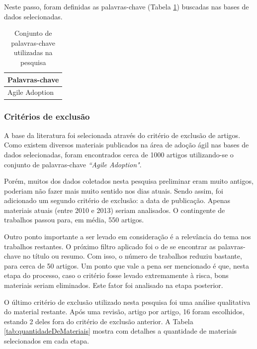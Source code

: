 Neste passo, foram definidas as palavras-chave (Tabela \ref{tab:palavrasChave}) buscadas nas bases de dados selecionadas.

\begin{table}[H]
	\centering
	\begin{tabular}{| l |} \hline \textbf{Palavras-chave} \\ \hline
		Agile Adoption \\ \hline
	\end{tabular}
	\caption{Conjunto de palavras-chave utilizadas na pesquisa}
	\label{tab:palavrasChave}
\end{table}

\subsubsection{Critérios de exclusão}

A base da literatura foi selecionada através do critério de exclusão de artigos. Como existem diversos materiais publicados na área de adoção ágil nas bases de dados selecionadas, foram encontrados cerca de 1000 artigos utilizando-se o conjunto de palavras-chave \textit{``Agile Adoption"}.

Porém, muitos dos dados coletados nesta pesquisa preliminar eram muito antigos, poderiam não fazer mais muito sentido nos dias atuais. Sendo assim, foi adicionado um segundo critério de exclusão: a data de publicação. Apenas materiais atuais (entre 2010 e 2013) seriam analisados. O contingente de trabalhos passou para, em média, 550 artigos.

Outro ponto importante a ser levado em consideração é a relevância do tema nos trabalhos restantes. O próximo filtro aplicado foi o de se encontrar as palavras-chave no título ou resumo. Com isso, o número de trabalhos reduziu bastante, para cerca de 50 artigos. Um ponto que vale a pena ser mencionado é que, nesta etapa do processo, caso o critério fosse levado extremamente à risca, bons materiais seriam eliminados. Este fator foi analisado na etapa posterior.

O último critério de exclusão utilizado nesta pesquisa foi uma análise qualitativa do material restante. Após uma revisão, artigo por artigo, 16 foram escolhidos, estando 2 deles fora do critério de exclusão anterior. A Tabela  \ref{tab:quantidadeDeMateriais} mostra com detalhes a quantidade de materiais selecionados em cada etapa.

